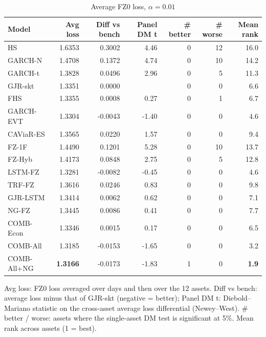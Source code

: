 \begin{table}[htbp]
\centering
\footnotesize
\caption{Average FZ0 loss, $\alpha=0.01$}
\label{tab:loss_a010}
\begin{tabular}{lrrrrrr}
\toprule
Model & Avg loss & Diff vs bench & Panel DM t & \# better & \# worse & Mean rank \\
\midrule
HS & 1.6353 & 0.3002 & 4.46 & 0 & 12 & 16.0 \\
GARCH-N & 1.4708 & 0.1372 & 4.74 & 0 & 10 & 14.2 \\
GARCH-t & 1.3828 & 0.0496 & 2.96 & 0 & 5 & 11.3 \\
GJR-skt & 1.3351 & 0.0000 &  & 0 & 0 & 6.6 \\
FHS & 1.3355 & 0.0008 & 0.27 & 0 & 1 & 6.7 \\
GARCH-EVT & 1.3304 & -0.0043 & -1.40 & 0 & 0 & 4.6 \\
CAViaR-ES & 1.3565 & 0.0220 & 1.57 & 0 & 0 & 9.4 \\
FZ-1F & 1.4490 & 0.1201 & 5.28 & 0 & 10 & 13.7 \\
FZ-Hyb & 1.4173 & 0.0848 & 2.75 & 0 & 5 & 12.8 \\
LSTM-FZ & 1.3281 & -0.0082 & -0.45 & 0 & 0 & 4.6 \\
TRF-FZ & 1.3616 & 0.0246 & 0.83 & 0 & 0 & 9.8 \\
GJR-LSTM & 1.3414 & 0.0062 & 0.62 & 0 & 0 & 7.1 \\
NG-FZ & 1.3445 & 0.0086 & 0.41 & 0 & 0 & 7.7 \\
COMB-Econ & 1.3346 & 0.0015 & 0.17 & 0 & 0 & 6.5 \\
COMB-All & 1.3185 & -0.0153 & -1.65 & 0 & 0 & 3.2 \\
COMB-All+NG & \textbf{1.3166} & -0.0173 & -1.83 & 1 & 0 & \textbf{1.9} \\
\bottomrule
\end{tabular}
\par\smallskip\parbox{\linewidth}{\scriptsize Avg loss: FZ0 loss averaged over days and then over the 12 assets. Diff vs bench: average loss minus that of GJR-skt (negative = better); Panel DM t: Diebold--Mariano statistic on the cross-asset average loss differential (Newey--West). \# better / worse: assets where the single-asset DM test is significant at 5\%. Mean rank across assets (1 = best).}
\end{table}